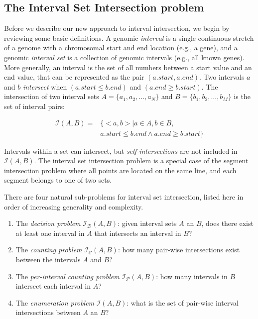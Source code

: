 \documentclass{bioinfo}
\begin{document}
	\subsection{The Interval Set Intersection problem}
	Before we describe our new approach to interval intersection, we begin by reviewing
	some basic definitions.  A genomic \emph{interval} is a single continuous stretch of a genome 
	with a chromosomal start and end location (e.g., a gene), and a genomic \emph{interval set} is a
	collection of genomic intervals (e.g., all known genes).  More generally, an
	interval is the set of all numbers between a start value and an end value, that
	can be represented as the pair $(a.start, a.end)$.  Two intervals $a$ and $b$
	{\em intersect} when $(a.start \leq b.end)$ and $(a.end \geq b.start)$.  The
	intersection of two interval sets $A=\{a_1, a_2, \dots, a_N\}$ and
	$B=\{b_1, b_2, \dots, b_M\}$ is the set of interval pairs:

	\begin{equation*}
		\begin{split}
			\mathcal{I}(A,B)= &\{ <a,b> | a \in A, b \in B, \\
			& a.start \leq b.end \wedge a.end \geq b.start\}
		\end{split}
	\end{equation*}

	Intervals within a set can intersect, but {\em self-intersections} are not
	included in $\mathcal{I}(A,B)$.  The interval set intersection problem is a
	special case of the segment intersection problem where all points are located on
	the same line, and each segment belongs to one of two sets.

	There are four natural sub-problems for interval set intersection, listed here
	in order of increasing generality and complexity.
	\begin{enumerate}
		\item The {\em decision problem} $\mathcal{I_D}(A,B)$:  given interval sets $A$
		an $B$, does there exist at least one interval in $A$ that intersects an interval in
		$B$?
		\item The {\em counting problem} $\mathcal{I_C}(A,B)$: how many pair-wise
		intersections exist between the intervals $A$ and $B$?
		\item The {\em per-interval counting problem} $\mathcal{I_P}(A,B)$: how many
		intervals in $B$ intersect each interval in $A$?
		\item The {\em enumeration problem} $\mathcal{I}(A,B)$: what is the set of
		pair-wise interval intersections between $A$ an $B$?
	\end{enumerate}
\end{document}
